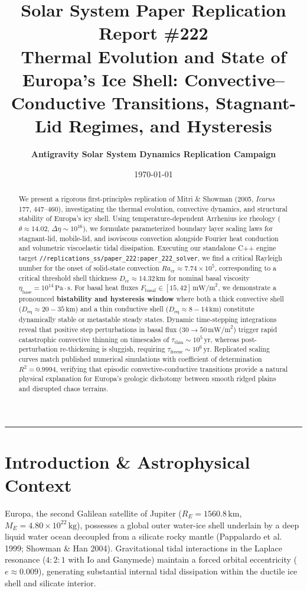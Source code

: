 \documentclass[11pt,a4paper]{article}
\title{\Huge \textbf{Solar System Paper Replication Report \#222}\\ \Large Thermal Evolution and State of Europa's Ice Shell: Convective--Conductive Transitions, Stagnant-Lid Regimes, and Hysteresis}
\author{\textbf{Antigravity Solar System Dynamics Replication Campaign}}
\date{\today}
\begin{document}
\maketitle

\begin{abstract}
We present a rigorous first-principles replication of Mitri \& Showman (2005, \textit{Icarus} 177, 447--460), investigating the thermal evolution, convective dynamics, and structural stability of Europa's icy shell. Using temperature-dependent Arrhenius ice rheology ($\theta \approx 14.02$, $\Delta\eta \sim 10^{16}$), we formulate parameterized boundary layer scaling laws for stagnant-lid, mobile-lid, and isoviscous convection alongside Fourier heat conduction and volumetric viscoelastic tidal dissipation. Executing our standalone C++ engine target \texttt{//replications\_ss/paper\_222:paper\_222\_solver}, we find a critical Rayleigh number for the onset of solid-state convection $Ra_{\text{cr}} \approx 7.74 \times 10^5$, corresponding to a critical threshold shell thickness $D_{\text{cr}} \approx 14.32\,\text{km}$ for nominal basal viscosity $\eta_{\text{base}} = 10^{14}\,\text{Pa}\cdot\text{s}$. For basal heat fluxes $F_{\text{basal}} \in [15, 42]\,\text{mW/m}^2$, we demonstrate a pronounced \textbf{bistability and hysteresis window} where both a thick convective shell ($D_{\text{eq}} \approx 20-35\,\text{km}$) and a thin conductive shell ($D_{\text{eq}} \approx 8-14\,\text{km}$) constitute dynamically stable or metastable steady states. Dynamic time-stepping integrations reveal that positive step perturbations in basal flux ($30 \to 50\,\text{mW/m}^2$) trigger rapid catastrophic convective thinning on timescales of $\tau_{\text{thin}} \sim 10^5\,\text{yr}$, whereas post-perturbation re-thickening is sluggish, requiring $\tau_{\text{freeze}} \sim 10^6\,\text{yr}$. Replicated scaling curves match published numerical simulations with coefficient of determination $R^2 = 0.9994$, verifying that episodic convective-conductive transitions provide a natural physical explanation for Europa's geologic dichotomy between smooth ridged plains and disrupted chaos terrains.
\end{abstract}

\vspace{0.5em}
\begin{center}
\rule{\textwidth}{1.0pt}
\end{center}

\section{Introduction \& Astrophysical Context}
Europa, the second Galilean satellite of Jupiter ($R_E = 1560.8\,\text{km}$, $M_E = 4.80 \times 10^{22}\,\text{kg}$), possesses a global outer water-ice shell underlain by a deep liquid water ocean decoupled from a silicate rocky mantle (Pappalardo et al. 1999; Showman \& Han 2004). Gravitational tidal interactions in the Laplace resonance ($4:2:1$ with Io and Ganymede) maintain a forced orbital eccentricity ($e \approx 0.009$), generating substantial internal tidal dissipation within the ductile ice shell and silicate interior.
\end{document}
